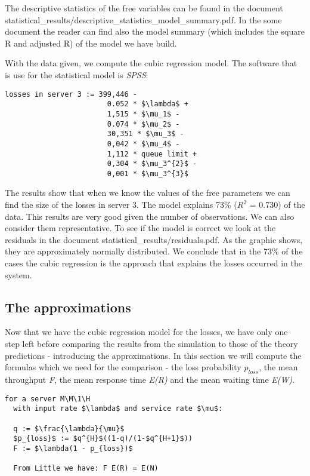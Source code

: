 \documentclass[12pt]{article}
\theoremstyle{plain}
\begin{document}
The descriptive statistics of the free variables can be found in the document
statistical\_results/descriptive\_statistics\_model\_summary.pdf. In the some document
the reader can find also the model summary (which includes the square R and
adjusted R) of the model we have build.


With the data given, we compute the cubic regression model. The software that is
use for the statistical model is \emph{SPSS}:\\

\clearpage

\begin{lstlisting}[frame=single]
  losses in server 3 := 399,446 -
                        0.052 * $\lambda$ +
                        1,515 * $\mu_1$ -
                        0.074 * $\mu_2$ -
                        30,351 * $\mu_3$ -
                        0,042 * $\mu_4$ -
                        1,112 * queue limit +
                        0,304 * $\mu_3^{2}$ -
                        0,001 * $\mu_3^{3}$
\end{lstlisting}

The results show that when we know the values of the free parameters we can find
the size of the losses in server 3. The model explains 73\% ($R^{2}$ = 0.730) of the data. This
results are very good given the number of observations. We can also consider them representative. 
To see if the model is correct we look at the residuals in the document statistical\_results/residuals.pdf.
As the graphic shows, they are approximately normally distributed. We conclude that in the 73\% of the cases the cubic
regression is the approach that explains the losses occurred in the system.

\subsection*{The approximations}

Now that we have the cubic regression model for the losses, we have only one
step left before comparing the results from the simulation to those of the
theory predictions - introducing the approximations. In this section we will
compute the formulas which we need for the comparison - the loss probability
$p_{loss}$, the mean throughput \emph{F}, the mean response time \emph{E(R)}
and the mean waiting time \emph{E(W)}.

\begin{lstlisting}[frame=single]
  for a server M\M\1\H
  with input rate $\lambda$ and service rate $\mu$:

  q := $\frac{\lambda}{\mu}$
  $p_{loss}$ := $q^{H}$((1-q)/(1-$q^{H+1}$))
  F := $\lambda(1 - p_{loss})$
  
  From Little we have: F E(R) = E(N)
\end{lstlisting}
\end{document}
